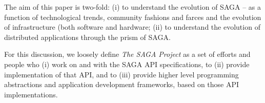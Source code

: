 \documentclass{article}
\newcommand{\I}[1]{\textit{#1}}
\begin{document}
The aim of this paper is two-fold: (i) to understand the evolution of
SAGA -- as a function of technological trends, community fashions and
farces and the evolution of infrastructure (both software and
hardware; (ii) to understand the evolution of distributed applications
through the prism of SAGA.

For this discussion, we loosely define \I{The SAGA Project} as a set
of efforts and people who (i) work on and with the SAGA API
specifications\cite{saga-core}, to (ii) provide
implementation of that API, %
and to (iii)
provide higher level programming abstractions and application
development frameworks, based on those API
implementations\cite{bigjob_cloudcom10}.

 

 
\end{document}
